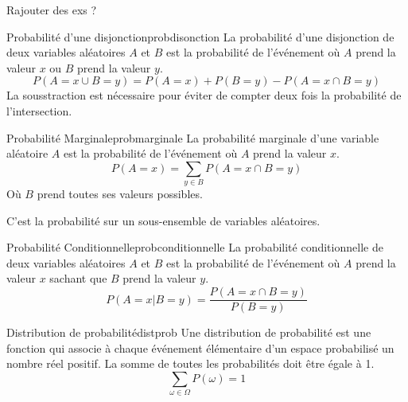 \begin{example}\leavevmode
    Rajouter des exs ?
\end{example}

\begin{definition}{Probabilité d'une disjonction}{probdisonction}
    La probabilité d'une disjonction de deux variables aléatoires $A$ et $B$ est la probabilité de l'événement 
    où $A$ prend la valeur $x$ ou $B$ prend la valeur $y$.
    \begin{equation}
        P(A=x \cup B=y) = P(A=x) + P(B=y) - P(A=x\cap B=y)
    \end{equation}
    La sousstraction est nécessaire pour éviter de compter deux fois la probabilité de l'intersection.
\end{definition}

\newpage


\begin{definition}{Probabilité Marginale}{probmarginale}
    La probabilité marginale d'une variable aléatoire $A$ est la probabilité de l'événement 
    où $A$ prend la valeur $x$.
    \begin{equation}
        P(A=x) = \sum_{y \in B} P(A=x \cap B=y)
    \end{equation} 
    Où $B$ prend toutes ses valeurs possibles.
    
\end{definition}
\begin{remark}\leavevmode
    C'est la probabilité sur un sous-ensemble de variables aléatoires.
\end{remark}


\begin{definition}{Probabilité Conditionnelle}{probconditionnelle}
    La probabilité conditionnelle de deux variables aléatoires $A$ et $B$ est la probabilité de l'événement 
    où $A$ prend la valeur $x$ sachant que $B$ prend la valeur $y$.
    \begin{equation}
        P(A=x | B=y) = \frac{P(A=x\cap B=y)}{P(B=y)}
    \end{equation} 
\end{definition}

\begin{definition}{Distribution de probabilité}{distprob}
    Une distribution de probabilité est une fonction qui associe à chaque événement élémentaire 
    d'un espace probabilisé un nombre réel positif. 
    La somme de toutes les probabilités doit être égale à 1.
    \begin{equation}
        \sum_{\omega \in \Omega} P(\omega) = 1
    \end{equation}

\end{definition}

